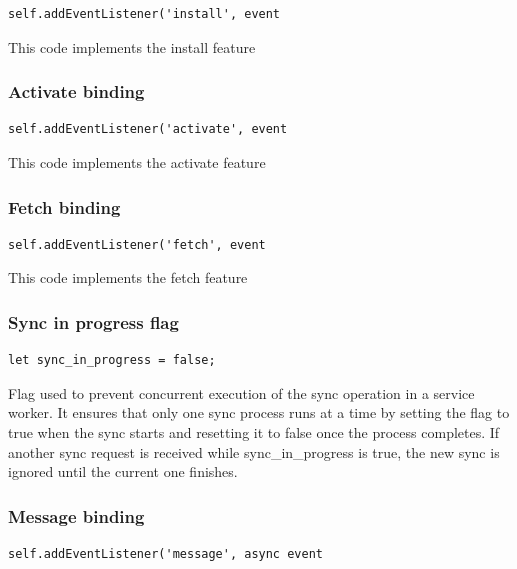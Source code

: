 \documentclass[a4paper]{article}
\begin{document}
\begin{lstlisting}
self.addEventListener('install', event
\end{lstlisting}

This code implements the install feature

\hypertarget{toc275}{}
\subsubsection{Activate binding}

\begin{lstlisting}
self.addEventListener('activate', event
\end{lstlisting}

This code implements the activate feature

\hypertarget{toc276}{}
\subsubsection{Fetch binding}

\begin{lstlisting}
self.addEventListener('fetch', event
\end{lstlisting}

This code implements the fetch feature

\hypertarget{toc277}{}
\subsubsection{Sync in progress flag}

\begin{lstlisting}
let sync_in_progress = false;
\end{lstlisting}

Flag used to prevent concurrent execution of the sync operation in a service worker.
It ensures that only one sync process runs at a time by setting the flag to true
when the sync starts and resetting it to false once the process completes. If another
sync request is received while sync\_in\_progress is true, the new sync is ignored
until the current one finishes.

\hypertarget{toc278}{}
\subsubsection{Message binding}

\begin{lstlisting}
self.addEventListener('message', async event
\end{lstlisting}
\end{document}

